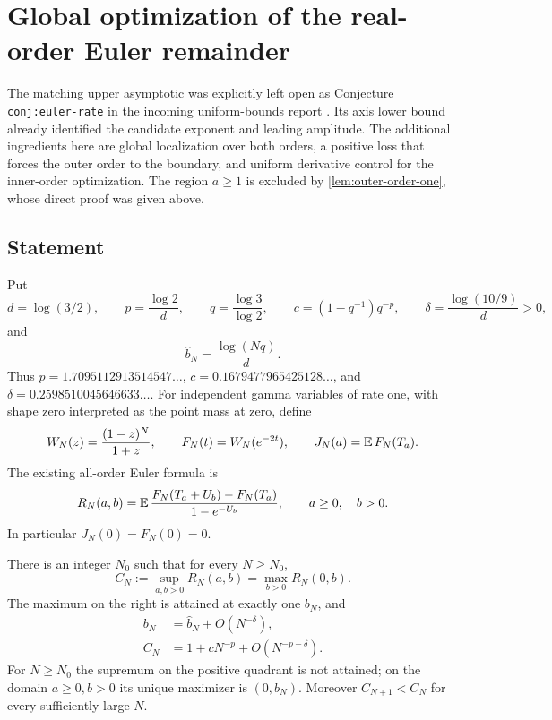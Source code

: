 \section{Global optimization of the real-order Euler remainder}
\label{eul:sec:global}
The matching upper asymptotic was explicitly left open as Conjecture
\texttt{conj:euler-rate} in the incoming uniform-bounds report
\cite{UniformBoundsIncoming}. Its axis lower bound already identified
the candidate exponent and leading amplitude. The additional ingredients
here are global localization over both orders, a positive loss that
forces the outer order to the boundary, and uniform derivative control
for the inner-order optimization. The region $a\geq1$ is excluded by
\cref{lem:outer-order-one}, whose direct proof was given above.

\subsection{Statement}
Put
\[
 d=\log(3/2),\qquad p=\frac{\log2}{d},\qquad
 q=\frac{\log3}{\log2},\qquad
 c=(1-q^{-1})q^{-p},\qquad
 \delta=\frac{\log(10/9)}d>0,
\]
and
\[
 \widehat b_N=\frac{\log(Nq)}d.
\]
Thus $p=1.7095112913514547\ldots$,
$c=0.1679477965425128\ldots$, and
$\delta=0.2598510045646633\ldots$.
For independent gamma variables of rate one, with shape zero interpreted
as the point mass at zero, define
\[
 W_N(z)=\frac{(1-z)^N}{1+z},\qquad
 F_N(t)=W_N(e^{-2t}),\qquad
 J_N(a)=\operatorname{\mathbb E} F_N(T_a).
\]
The existing all-order Euler formula is
\begin{equation}\label{eul:eq:R}
 R_N(a,b)=\operatorname{\mathbb E}\frac{F_N(T_a+U_b)-F_N(T_a)}{1-e^{-U_b}},
 \qquad a\geq0,\quad b>0.
\end{equation}
In particular $J_N(0)=F_N(0)=0$.

\begin{theorem}\label{eul:thm:main}
There is an integer $N_0$ such that for every $N\geq N_0$,
\begin{equation}\label{eul:eq:axisexact}
 C_N:=\sup_{a,b>0}R_N(a,b)
   =\max_{b>0}R_N(0,b).
\end{equation}
The maximum on the right is attained at exactly one $b_N$, and
\begin{align}
 b_N&=\widehat b_N+O(N^{-\delta}),\label{eul:eq:bn}\\
 C_N&=1+cN^{-p}+O(N^{-p-\delta}).\label{eul:eq:cn}
\end{align}
For $N\geq N_0$ the supremum on the positive quadrant is not attained;
on the domain $a\geq0,b>0$ its unique maximizer is $(0,b_N)$.
Moreover $C_{N+1}<C_N$ for every sufficiently large $N$.
\end{theorem}

